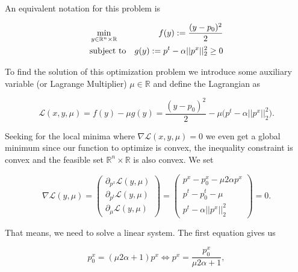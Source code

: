             An equivalent notation for this problem is

            \begin{eqnarray}
                &\min\limits_{y \in \mathbb{R}^{n} \times \mathbb{R}}& f(y) := \frac{(y - p_{0})^{2}}{2} \notag \\
                &\textnormal{subject to}& g(y) := p^{t} - \alpha ||p^{x}||_{2}^{2} \ge 0 \notag
            \end{eqnarray}

        To find the solution of this optimization problem we introduce some auxiliary variable (or Lagrange Multiplier) $\mu \in \mathbb{R}$ and define the Lagrangian as

        \begin{equation}
            \mathcal{L}(x, y, \mu) = f(y) - \mu g(y) = \frac{(y - p_{0})^{2}}{2} - \mu \bigg( p^{t} - \alpha||p^{x}||_{2}^{2} \bigg).
        \end{equation}

        Seeking for the local minima where $\nabla \mathcal{L}(x, y, \mu) = 0$ we even get a global minimum since our function to optimize is convex, the inequality constraint is convex and the feasible set $\mathbb{R}^{n} \times \mathbb{R}$ is also convex. We set

        \begin{equation}
            \nabla \mathcal{L}(y, \mu) =
            \begin{pmatrix}
                \partial_{p^{x}} \mathcal{L}(y, \mu) \\
                \partial_{p^{t}} \mathcal{L}(y, \mu) \\
                \partial_{\mu} \mathcal{L}(y, \mu)
            \end{pmatrix} = 
            \begin{pmatrix}
                p^{x} - p_{0}^{x} - \mu 2 \alpha p^{x} \\
                p^{t} - p_{0}^{t} - \mu \\
                p^{t} - \alpha||p^{x}||_{2}^{2}
            \end{pmatrix}
            = 0. \label{eq:linearSystem}
        \end{equation}

        That means, we need to solve a linear system. The first equation gives us

        \begin{equation}
            p_{0}^{x} = (\mu 2 \alpha + 1) p^{x} \Longleftrightarrow p^{x} = \frac{p_{0}^{x}}{\mu 2 \alpha + 1}, \label{eq:1stequ}
        \end{equation}

